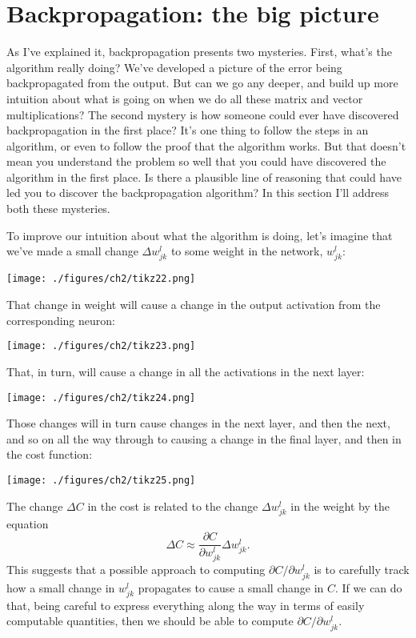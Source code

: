 \documentclass[a4paper,twoside,10pt]{book}
\begin{document}
\section{Backpropagation: the big picture}
\label{sec:2.9}
As I've explained it, backpropagation presents two mysteries. First, what's the algorithm really doing? We've developed a picture of the error being backpropagated from the output. But can we go any deeper, and build up more intuition about what is going on when we do all these matrix and vector multiplications? The second mystery is how someone could ever have discovered backpropagation in the first place? It's one thing to follow the steps in an algorithm, or even to follow the proof that the algorithm works. But that doesn't mean you understand the problem so well that you could have discovered the algorithm in the first place. Is there a plausible line of reasoning that could have led you to discover the backpropagation algorithm? In this section I'll address both these mysteries.

To improve our intuition about what the algorithm is doing, let's imagine that we've made a small change $\Delta{}w^l_{jk}$ to some weight in the network, $w^l_{jk}$:
\begin{center}
	\texttt{[image: ./figures/ch2/tikz22.png]}
\end{center}
That change in weight will cause a change in the output activation from the corresponding neuron:
\begin{center}
	\texttt{[image: ./figures/ch2/tikz23.png]}
\end{center}
That, in turn, will cause a change in all the activations in the next layer:
\begin{center}
	\texttt{[image: ./figures/ch2/tikz24.png]}
\end{center}
Those changes will in turn cause changes in the next layer, and then the next, and so on all the way through to causing a change in the final layer, and then in the cost function:
\begin{center}
	\texttt{[image: ./figures/ch2/tikz25.png]}
\end{center}
The change $\Delta{}C$ in the cost is related to the change $\Delta{}w^l_{jk}$ in the weight by the equation
\begin{equation}
	\Delta C \approx \frac{\partial C}{\partial w^l_{jk}} \Delta w^l_{jk}.
	\tag{47}\label{eq:47}
\end{equation}
This suggests that a possible approach to computing $\partial{}C/\partial{}w^l_{jk}$ is to carefully track how a small change in $w^l_{jk}$ propagates to cause a small change in $C$. If we can do that, being careful to express everything along the way in terms of easily computable quantities, then we should be able to compute $\partial{}C/\partial{}w^l_{jk}$.
\end{document}
